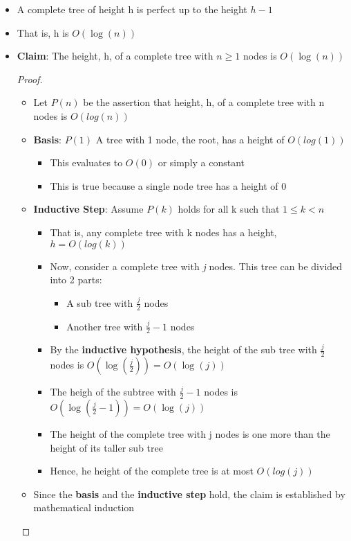 \documentclass[10pt, 
a4paper, 
oneside, 
headinclude, footinclude, 
BCOR5mm]
{scrartcl}
\begin{document}
\begin{itemize}
    \item A complete tree of height h is perfect up to the height $h - 1$
    \item That is, h is $O(\log(n))$
    \item \textbf{Claim}: The height, h, of a complete tree with $n \geq 1$ nodes is $O(\log(n))$ 
    \begin{proof}
        \begin{itemize}
            \item Let $P(n)$ be the assertion that height, h, of a complete tree with n nodes is $O(log(n))$
            \item \textbf{Basis}: $P(1)$ A tree with 1 node, the root, has a height of $O(log(1))$
            \begin{itemize}
                \item This evaluates to $O(0)$ or simply a constant
                \item This is true because a single node tree has a height of 0
            \end{itemize}
            \item \textbf{Inductive Step}: Assume $P(k)$ holds for all k such that $1 \leq k < n$
            \begin{itemize}
                \item That is, any complete tree with k nodes has a height, $h = O(log(k))$
                \item Now, consider a complete tree with \textit{j} nodes. This tree can be divided into 2 parts:
                \begin{itemize}
                    \item A sub tree with $\frac{j}{2}$ nodes
                    \item Another tree with $\frac{j}{2}-1$ nodes
                \end{itemize}
                \item By the \textbf{inductive hypothesis}, the height of the sub tree with $\frac{j}{2}$ nodes is $O(\log(\frac{j}{2}))=O(\log(j))$
                \item The heigh of the subtree with $\frac{j}{2}-1$ nodes is $O(\log(\frac{j}{2}-1))=O(\log(j))$
                \item The height of the complete tree with j nodes is one more than the height of its taller sub tree
                \item Hence, he height of the complete tree is at most $O(log(j))$
            \end{itemize}
            \item Since the \textbf{basis} and the \textbf{inductive step} hold, the claim is established by mathematical induction
        \end{itemize}
    \end{proof}
\end{itemize}
\end{document}
